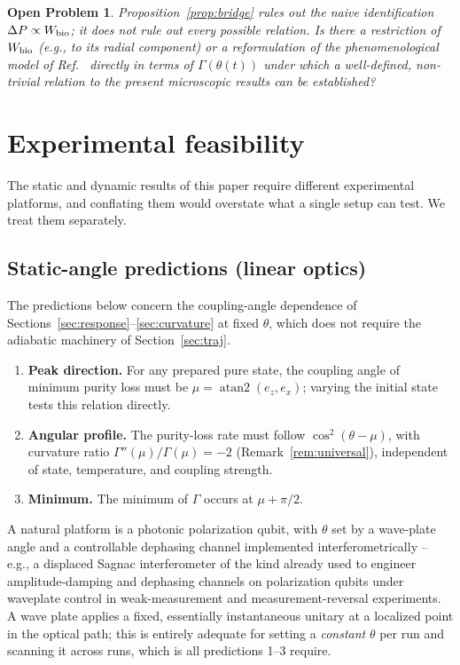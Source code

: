 \documentclass[aps,pra,reprint,superscriptaddress,nofootinbib,longbibliography]{revtex4-2}
\newtheorem{openproblem}[theorem]{Open Problem}
\newcommand{\Wbio}{W_{\rm bio}}
\begin{document}
\begin{openproblem}
\label{op:bridge}
Proposition~\ref{prop:bridge} rules out the naive identification
$\Delta P\propto\Wbio$; it does not rule out every possible relation.
Is there a restriction of $\Wbio$ (e.g., to its radial component) or a
reformulation of the phenomenological model of
Ref.~\cite{rodrigues2025} directly in terms of $\Gamma(\theta(t))$
under which a well-defined, non-trivial relation to the present
microscopic results can be established?
\end{openproblem}

\section{Experimental feasibility}
\label{sec:exp}

The static and dynamic results of this paper require different
experimental platforms, and conflating them would overstate what a
single setup can test. We treat them separately.

\subsection{Static-angle predictions (linear optics)}
\label{sec:exp_static}

The predictions below concern the coupling-angle dependence of
Sections~\ref{sec:response}--\ref{sec:curvature} at fixed $\theta$,
which does not require the adiabatic machinery of
Section~\ref{sec:traj}.

\begin{enumerate}
\item \textbf{Peak direction.} For any prepared pure state, the
coupling angle of minimum purity loss must be
$\mu=\operatorname{atan2}(e_z,e_x)$; varying the initial state tests
this relation directly.
\item \textbf{Angular profile.} The purity-loss rate must follow
$\cos^2(\theta-\mu)$, with curvature ratio $\Gamma''(\mu)/\Gamma(\mu)=-2$
(Remark~\ref{rem:universal}), independent of state, temperature, and
coupling strength.
\item \textbf{Minimum.} The minimum of $\Gamma$ occurs at $\mu+\pi/2$.
\end{enumerate}

A natural platform is a photonic polarization qubit, with $\theta$ set
by a wave-plate angle and a controllable dephasing channel implemented
interferometrically -- e.g., a displaced Sagnac interferometer of the
kind already used to engineer amplitude-damping and dephasing channels
on polarization qubits under waveplate control in weak-measurement and
measurement-reversal experiments. A wave plate applies a fixed,
essentially instantaneous unitary at a localized point in the optical
path; this is entirely adequate for setting a \emph{constant} $\theta$
per run and scanning it across runs, which is all predictions 1--3
require.
\end{document}
